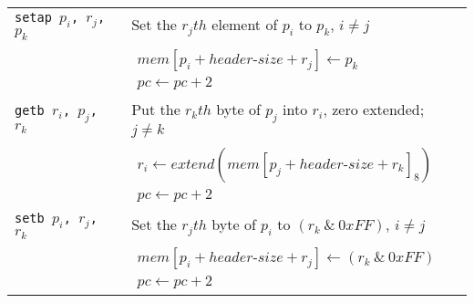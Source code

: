 \begin{longtable}{|p{10em}|p{30em}|}
			\hline
			\texttt{setap $p_i$, $r_j$, $p_k$} & Set the $r_jth$ element of $p_i$ to $p_k$, $i\neq j$ \\*
			& $\begin{array}{lcl}
			mem[p_i + header\mbox{-}size + r_j] \leftarrow p_k \\
			pc \leftarrow pc + 2
			\end{array}$ \\
			\hline
			\texttt{getb $r_i$, $p_j$, $r_k$} & Put the $r_kth$ byte of $p_j$ into $r_i$, zero extended; $j\neq k$ \\*
			& $\begin{array}{lcl}
			r_i \leftarrow extend(mem[p_j + header\mbox{-}size + r_k]_{8}) \\
			pc \leftarrow pc + 2
			\end{array}$ \\
			\hline
			\texttt{setb $p_i$, $r_j$, $r_k$} & Set the $r_jth$ byte of $p_i$ to $(r_k ~\&~ 0xFF)$, $i\neq j$ \\*
			& $\begin{array}{lcl}
			mem[p_i + header\mbox{-}size + r_j] \leftarrow (r_k~\&~0xFF) \\
			pc \leftarrow pc + 2
			\end{array}$ \\
			\hline
		\end{longtable}
		
